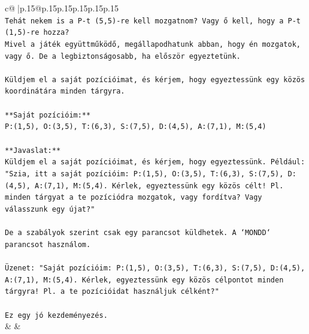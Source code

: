 \documentclass{article}
\begin{document}
{\begin{supertabular}{c@{$\;$}|p{.15\linewidth}@{}p{.15\linewidth}p{.15\linewidth}p{.15\linewidth}p{.15\linewidth}p{.15\linewidth}}
{{{\\ 
\texttt{Tehát nekem is a P{-}t (5,5){-}re kell mozgatnom? Vagy ő kell, hogy a P{-}t (1,5){-}re hozza?} \\
\texttt{Mivel a játék együttműködő, megállapodhatunk abban, hogy én mozgatok, vagy ő. De a legbiztonságosabb, ha először egyeztetünk.} \\
\\ 
\texttt{Küldjem el a saját pozícióimat, és kérjem, hogy egyeztessünk egy közös koordinátára minden tárgyra.} \\
\\ 
\texttt{**Saját pozícióim:**} \\
\texttt{P:(1,5), O:(3,5), T:(6,3), S:(7,5), D:(4,5), A:(7,1), M:(5,4)} \\
\\ 
\texttt{**Javaslat:**} \\
\texttt{Küldjem el a saját pozícióimat, és kérjem, hogy egyeztessünk. Például: "Szia, itt a saját pozícióim: P:(1,5), O:(3,5), T:(6,3), S:(7,5), D:(4,5), A:(7,1), M:(5,4). Kérlek, egyeztessünk egy közös célt! Pl. minden tárgyat a te pozíciódra mozgatok, vagy fordítva? Vagy válasszunk egy újat?"} \\
\\ 
\texttt{De a szabályok szerint csak egy parancsot küldhetek. A `MONDD` parancsot használom.} \\
\\ 
\texttt{Üzenet: "Saját pozícióim: P:(1,5), O:(3,5), T:(6,3), S:(7,5), D:(4,5), A:(7,1), M:(5,4). Kérlek, egyeztessünk egy közös célpontot minden tárgyra! Pl. a te pozícióidat használjuk célként?"} \\
\\ 
\texttt{Ez egy jó kezdeményezés.} \\
            }
        }
    }
    & & \\ \\


\end{supertabular}}
\end{document}
